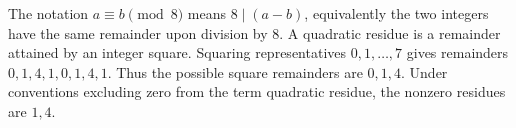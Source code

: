 The notation $a\equiv b\pmod8$ means $8\mid(a-b)$, equivalently the two integers have the same remainder upon division by $8$. A quadratic residue is a remainder attained by an integer square. Squaring representatives $0,1,\ldots,7$ gives remainders $0,1,4,1,0,1,4,1$. Thus the possible square remainders are $\boxed{0,1,4}$. Under conventions excluding zero from the term quadratic residue, the nonzero residues are $1,4$.
